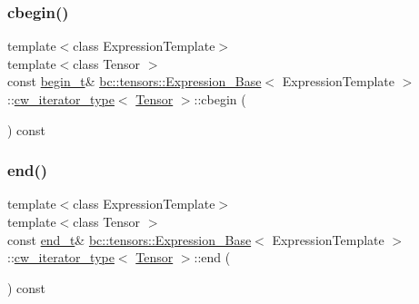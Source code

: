 \mbox{\label{structbc_1_1tensors_1_1Expression__Base_1_1cw__iterator__type_acda6d70c43f3f1af348fa64e1070355c}} 
\subsubsection{\texorpdfstring{cbegin()}{cbegin()}}
{\footnotesize\ttfamily template$<$class Expression\+Template$>$ \\
template$<$class Tensor $>$ \\
const \hyperlink{structbc_1_1tensors_1_1Expression__Base_1_1cw__iterator__type_a61e8ad264dbd2dc886a84e03cd45867e}{begin\+\_\+t}\& \hyperlink{classbc_1_1tensors_1_1Expression__Base}{bc\+::tensors\+::\+Expression\+\_\+\+Base}$<$ Expression\+Template $>$\+::\hyperlink{structbc_1_1tensors_1_1Expression__Base_1_1cw__iterator__type}{cw\+\_\+iterator\+\_\+type}$<$ \hyperlink{namespacebc_a659391e47ab612be3ba6c18cf9c89159}{Tensor} $>$\+::cbegin (\begin{DoxyParamCaption}{ }\end{DoxyParamCaption}) const\hspace{0.3cm}{\ttfamily [inline]}}

\mbox{\label{structbc_1_1tensors_1_1Expression__Base_1_1cw__iterator__type_a86cb0e59aaf51e9bb3676f9c5760a70b}} 
\subsubsection{\texorpdfstring{end()}{end()}}
{\footnotesize\ttfamily template$<$class Expression\+Template$>$ \\
template$<$class Tensor $>$ \\
const \hyperlink{structbc_1_1tensors_1_1Expression__Base_1_1cw__iterator__type_aa4dec4d7233266282d8243b49a101174}{end\+\_\+t}\& \hyperlink{classbc_1_1tensors_1_1Expression__Base}{bc\+::tensors\+::\+Expression\+\_\+\+Base}$<$ Expression\+Template $>$\+::\hyperlink{structbc_1_1tensors_1_1Expression__Base_1_1cw__iterator__type}{cw\+\_\+iterator\+\_\+type}$<$ \hyperlink{namespacebc_a659391e47ab612be3ba6c18cf9c89159}{Tensor} $>$\+::end (\begin{DoxyParamCaption}{ }\end{DoxyParamCaption}) const\hspace{0.3cm}{\ttfamily [inline]}}



